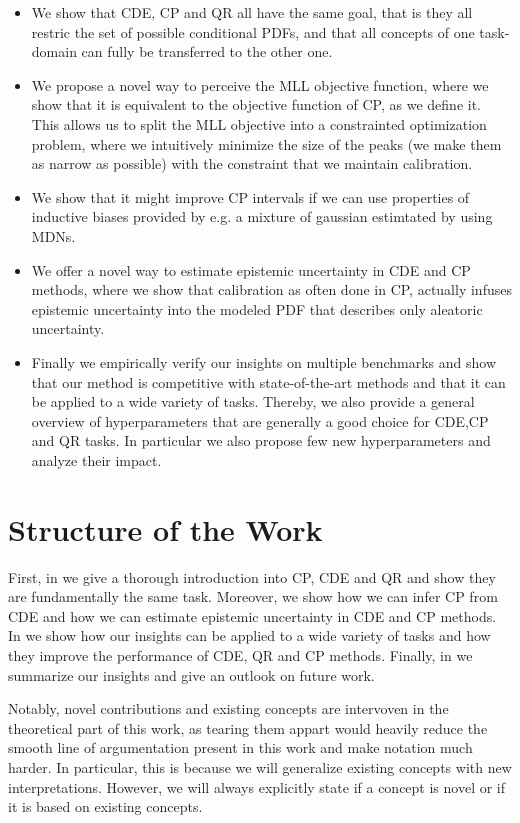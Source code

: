 \begin{itemize}
    \item We show that CDE, CP and QR all have the same goal, that is they all restric the set of possible conditional PDFs, and that all concepts of one task-domain can fully be transferred to the other one.
    \item We propose a novel way to perceive the MLL objective function, where we show that it is equivalent to the objective function of CP, as we define it. This allows us to split the MLL objective into a constrainted optimization problem, where we intuitively minimize the size of the peaks (we make them as narrow as possible) with the constraint that we maintain calibration.
    \item We show that it might improve CP intervals if we can use properties of inductive biases provided by e.g. a mixture of gaussian estimtated by using MDNs.
    \item We offer a novel way to estimate epistemic uncertainty in CDE and CP methods, where we show that calibration as often done in CP, actually infuses epistemic uncertainty into the modeled PDF that describes only aleatoric uncertainty.
    \item Finally we empirically verify our insights on multiple benchmarks and show that our method is competitive with state-of-the-art methods and that it can be applied to a wide variety of tasks. Thereby, we also provide a general overview of hyperparameters that are generally a good choice for CDE,CP and QR tasks. In particular we also propose few new hyperparameters and analyze their impact.
\end{itemize}

\section{Structure of the Work}\label{sec:structure}

First, in  we give a thorough introduction into CP, CDE and QR and show they are fundamentally the same task. Moreover, we show how we can infer CP from CDE and how we can estimate epistemic uncertainty in CDE and CP methods. In  we show how our insights can be applied to a wide variety of tasks and how they improve the performance of CDE, QR and CP methods. Finally, in  we summarize our insights and give an outlook on future work.

Notably, novel contributions and existing concepts are intervoven in the theoretical part of this work, as tearing them appart would heavily reduce the smooth line of argumentation present in this work and make notation much harder. In particular, this is because we will generalize existing concepts with new interpretations. However, we will always explicitly state if a concept is novel or if it is based on existing concepts.

